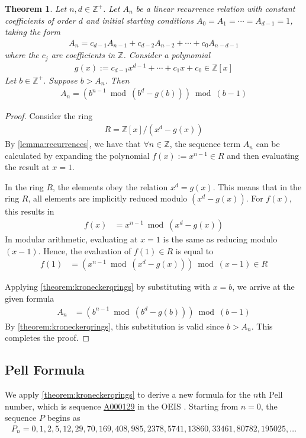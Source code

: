 \documentclass[11pt,reqno]{article}
\theoremstyle{plain}
\newtheorem{theorem}{Theorem}
\theoremstyle{definition}
\newcommand{\seqnum}[1]{\href{https://oeis.org/#1}{\rm \underline{#1}}}
\begin{document}
\begin{theorem} \label{theorem:recurrences}
Let $n,d \in \mathbb{Z}^+$. Let $A_n$ be a linear recurrence relation with constant coefficients of order $d$ and initial starting conditions $A_0=A_1=\cdots=A_{d-1}=1$, taking the form
\begin{align*}
    A_{n} = c_{d-1} A_{n-1} + c_{d-2} A_{n-2} + \cdots + c_{0} A_{n-d-1}
\end{align*}
where the $c_j$ are coefficients in $\mathbb{Z}$. Consider a polynomial
\begin{align*}
    g(x) := c_{d-1} x^{d-1} + \cdots + c_1 x + c_0 \in \mathbb{Z}[x]
\end{align*}
Let $b \in \mathbb{Z}^+$. Suppose $b > A_n$. Then
\begin{align*}
    A_{n} = (b^{n-1} \bmod{(b^d - g(b))}) \bmod{(b-1)}
\end{align*}
\end{theorem}
\begin{proof}
Consider the ring
\begin{align*}
    R = \mathbb{Z}[x]/(x^d-g(x))
\end{align*}
By \cref{lemma:recurrences}, we have that $\forall n \in \mathbb{Z}$, the sequence term $A_n$ can be calculated by expanding the polynomial $f(x) := x^{n-1} \in R$ and then evaluating the result at $x=1$.

In the ring $R$, the elements obey the relation $x^d = g(x)$. This means that in the ring $R$, all elements are implicitly reduced modulo $(x^d - g(x))$. For $f(x)$, this results in 
\begin{align*}
    f(x) &= x^{n-1} \bmod{(x^d - g(x))}
\end{align*}
In modular arithmetic, evaluating at $x=1$ is the same as reducing modulo $(x-1)$. Hence, the evaluation of $f(1) \in R$ is equal to
\begin{align*}
    f(1) &= (x^{n-1} \bmod{(x^d - g(x))}) \bmod{(x-1)} \in R
\end{align*}

Applying \cref{theorem:kroneckerqrings} by substituting with $x = b$, we arrive at the given formula
\begin{align*}
    A_n &= (b^{n-1} \bmod{(b^d - g(b))}) \bmod{(b-1)}
\end{align*}
By \cref{theorem:kroneckerqrings}, this substitution is valid since $b > A_n$. This completes the proof.
\end{proof}

\subsection{Pell Formula}
We apply \cref{theorem:kroneckerqrings} to derive a new formula for the $n$th Pell number, which is sequence \seqnum{A000129} in the OEIS \cite{A000129}. Starting from $n=0$, the sequence $P$ begins as
\begin{align*}
    P_n = 0, 1, 2, 5, 12, 29, 70, 169, 408, 985, 2378, 5741, 13860, 33461, 80782, 195025, \ldots
\end{align*}
\end{document}
